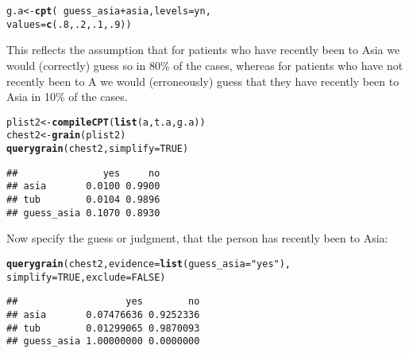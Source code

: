 \documentclass[10pt]{article}\usepackage[]{graphicx}\usepackage[]{xcolor}
\makeatletter
\newcommand{\hlnum}[1]{\textcolor[rgb]{0.686,0.059,0.569}{#1}}%
\newcommand{\hlstr}[1]{\textcolor[rgb]{0.192,0.494,0.8}{#1}}%
\newcommand{\hlopt}[1]{\textcolor[rgb]{0,0,0}{#1}}%
\newcommand{\hlstd}[1]{\textcolor[rgb]{0.345,0.345,0.345}{#1}}%
\newcommand{\hlkwb}[1]{\textcolor[rgb]{0.69,0.353,0.396}{#1}}%
\newcommand{\hlkwc}[1]{\textcolor[rgb]{0.333,0.667,0.333}{#1}}%
\newcommand{\hlkwd}[1]{\textcolor[rgb]{0.737,0.353,0.396}{\textbf{#1}}}%
\newenvironment{kframe}{%
 \def\at@end@of@kframe{}%
 \ifinner\ifhmode%
  \def\at@end@of@kframe{\end{minipage}}%
  \begin{minipage}{\columnwidth}%
 \fi\fi%
 \def\FrameCommand##1{\hskip\@totalleftmargin \hskip-\fboxsep
 \colorbox{shadecolor}{##1}\hskip-\fboxsep
     \hskip-\linewidth \hskip-\@totalleftmargin \hskip\columnwidth}%
 \MakeFramed {\advance\hsize-\width
   \@totalleftmargin\z@ \linewidth\hsize
   \@setminipage}}%
 {\par\unskip\endMakeFramed%
 \at@end@of@kframe}
\newenvironment{knitrout}{}{} %
\makeatother
\begin{document}
\begin{knitrout}
\color{fgcolor}\begin{kframe}
\begin{alltt}
\hlstd{g.a} \hlkwb{<-} \hlkwd{cpt}\hlstd{(}\hlopt{~}\hlstd{guess_asia}\hlopt{+}\hlstd{asia,} \hlkwc{levels}\hlstd{=yn,}
              \hlkwc{values}\hlstd{=}\hlkwd{c}\hlstd{(}\hlnum{.8}\hlstd{,} \hlnum{.2}\hlstd{,} \hlnum{.1}\hlstd{,} \hlnum{.9}\hlstd{))}
\end{alltt}
\end{kframe}
\end{knitrout}

This reflects the assumption that for patients who have recently been
to Asia we would (correctly) guess so in 80\% of the cases, whereas for patients who have
not recently been to A we would (erroneously) guess that they have
recently been to Asia in 10\% of the cases.

\begin{knitrout}
\color{fgcolor}\begin{kframe}
\begin{alltt}
\hlstd{plist2} \hlkwb{<-} \hlkwd{compileCPT}\hlstd{(}\hlkwd{list}\hlstd{(a, t.a, g.a ))}
\hlstd{chest2} \hlkwb{<-} \hlkwd{grain}\hlstd{(plist2)}
\hlkwd{querygrain}\hlstd{(chest2,} \hlkwc{simplify} \hlstd{=} \hlnum{TRUE}\hlstd{)}
\end{alltt}
\begin{verbatim}
##               yes     no
## asia       0.0100 0.9900
## tub        0.0104 0.9896
## guess_asia 0.1070 0.8930
\end{verbatim}
\end{kframe}
\end{knitrout}


Now specify the guess or judgment, that the person has recently been
to Asia:

\begin{knitrout}
\color{fgcolor}\begin{kframe}
\begin{alltt}
\hlkwd{querygrain}\hlstd{(chest2,} \hlkwc{evidence}\hlstd{=}\hlkwd{list}\hlstd{(}\hlkwc{guess_asia}\hlstd{=}\hlstr{"yes"}\hlstd{),}
           \hlkwc{simplify}\hlstd{=}\hlnum{TRUE}\hlstd{,} \hlkwc{exclude} \hlstd{=} \hlnum{FALSE}\hlstd{)}
\end{alltt}
\begin{verbatim}
##                   yes        no
## asia       0.07476636 0.9252336
## tub        0.01299065 0.9870093
## guess_asia 1.00000000 0.0000000
\end{verbatim}
\end{kframe}
\end{knitrout}
\end{document}
